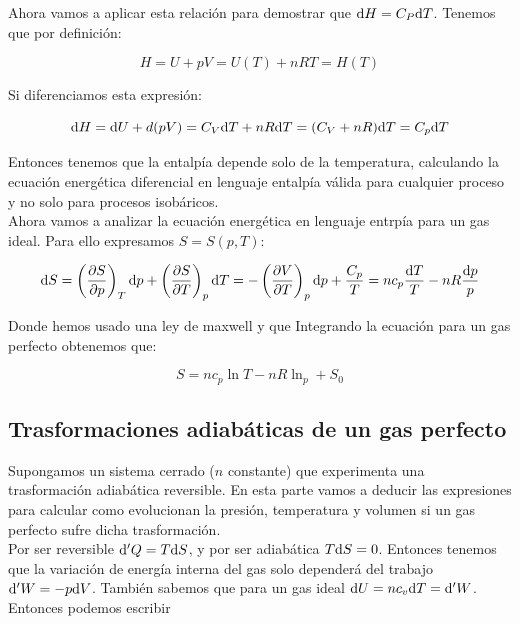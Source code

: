 \documentclass[12pt,a4paper]{article}
\begin{document}
Ahora vamos a aplicar esta relación para demostrar que $\mathrm{d} H = C_P \mathrm{d} T$. Tenemos que por definición:

\begin{equation}
H = U +pV = U(T) + nRT = H(T)
\end{equation}

Si diferenciamos esta expresión:

\begin{equation}
\mathrm{d} H = \mathrm{d} U + d(pV) = C_V \mathrm{d} T + nR \mathrm{d} T  = (C_V + nR) \mathrm{d} T = C_p \mathrm{d} T
\end{equation}

Entonces tenemos que la entalpía depende solo de la temperatura, calculando la ecuación energética diferencial en lenguaje entalpía válida para cualquier proceso y no solo para procesos isobáricos. \\

Ahora vamos a analizar la ecuación energética en lenguaje entrpía para un gas ideal. Para ello expresamos $S = S(p,T)$:

\begin{equation}
\mathrm{d} S = \left( \frac{\partial S}{\partial p} \right)_T \mathrm{d} p + \left( \frac{\partial S}{\partial T} \right)_p \mathrm{d} T =
-\left( \frac{\partial V}{\partial T} \right)_p \mathrm{d} p + \dfrac{C_p}{T} = n c_p \dfrac{\mathrm{d} T}{T} - nR \dfrac{\mathrm{d} p}{p}
\end{equation}

Donde hemos usado una ley de maxwell y que Integrando la ecuación para un gas perfecto obtenemos que:

\begin{equation}
S = n c_p \ln T - nR \ln_p + S_0
\end{equation}

\subsection{Trasformaciones adiabáticas de un gas perfecto}

Supongamos un sistema cerrado ($n$ constante) que experimenta una trasformación adiabática reversible. En esta parte vamos a deducir las expresiones para calcular como evolucionan la presión, temperatura y volumen si un gas perfecto sufre dicha trasformación. \\


 Por ser reversible $\mathrm{d}' Q = T \mathrm{d} S$, y por ser adiabática $T\mathrm{d} S = 0$. Entonces tenemos que la variación de energía interna del gas solo dependerá del trabajo $\mathrm{d} ' W = - p \mathrm{d} V$. También sabemos que para un gas ideal $\mathrm{d} U = n c_v \mathrm{d} T = \mathrm{d} ' W$. Entonces podemos escribir
\end{document}
